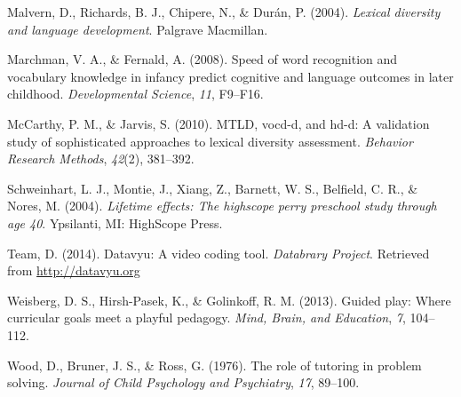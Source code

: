 \documentclass[man,floatsintext]{apa6}
\begin{document}
\leavevmode\hypertarget{ref-Malvern2004}{}%
Malvern, D., Richards, B. J., Chipere, N., \& Durán, P. (2004). \emph{Lexical diversity and language development}. Palgrave Macmillan.

\leavevmode\hypertarget{ref-Marchman2008}{}%
Marchman, V. A., \& Fernald, A. (2008). Speed of word recognition and vocabulary knowledge in infancy predict cognitive and language outcomes in later childhood. \emph{Developmental Science}, \emph{11}, F9--F16.

\leavevmode\hypertarget{ref-McCarthy2010}{}%
McCarthy, P. M., \& Jarvis, S. (2010). MTLD, vocd-d, and hd-d: A validation study of sophisticated approaches to lexical diversity assessment. \emph{Behavior Research Methods}, \emph{42}(2), 381--392.

\leavevmode\hypertarget{ref-PerryPreschool2004}{}%
Schweinhart, L. J., Montie, J., Xiang, Z., Barnett, W. S., Belfield, C. R., \& Nores, M. (2004). \emph{Lifetime effects: The highscope perry preschool study through age 40}. Ypsilanti, MI: HighScope Press.

\leavevmode\hypertarget{ref-datavyu}{}%
Team, D. (2014). Datavyu: A video coding tool. \emph{Databrary Project}. Retrieved from \url{http://datavyu.org}

\leavevmode\hypertarget{ref-Weisberg2013}{}%
Weisberg, D. S., Hirsh-Pasek, K., \& Golinkoff, R. M. (2013). Guided play: Where curricular goals meet a playful pedagogy. \emph{Mind, Brain, and Education}, \emph{7}, 104--112.

\leavevmode\hypertarget{ref-Wood1976}{}%
Wood, D., Bruner, J. S., \& Ross, G. (1976). The role of tutoring in problem solving. \emph{Journal of Child Psychology and Psychiatry}, \emph{17}, 89--100.

\endgroup

\clearpage
\makeatletter
\efloat@restorefloats
\makeatother
\end{document}
